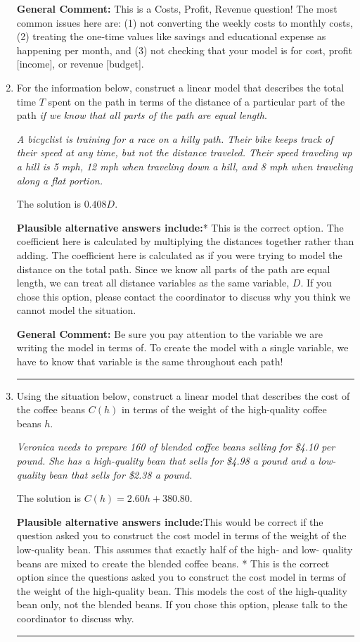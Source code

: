 \documentclass{extbook}[14pt]
\newcommand{\litem}[1]{\item #1

\rule{\textwidth}{0.4pt}}
\begin{document}
\begin{enumerate}
{\textbf{General Comment:} This is a Costs, Profit, Revenue question! The most common issues here are: (1) not converting the weekly costs to monthly costs, (2) treating the one-time values like savings and educational expense as happening per month, and (3) not checking that your model is for cost, profit [income], or revenue [budget].
}
\litem{
For the information below, construct a linear model that describes the total time $T$ spent on the path in terms of the distance of a particular part of the path \textit{if we know that all parts of the path are equal length}.

\begin{center}
    \textit{ A bicyclist is training for a race on a hilly path. Their bike keeps track of their speed at any time, but not the distance traveled. Their speed traveling up a hill is 5 mph, 12 mph when traveling down a hill, and 8 mph when traveling along a flat portion. }
\end{center}
The solution is \( 0.408 D \).\begin{enumerate}[label=\Alph*.]
\textbf{Plausible alternative answers include:}* This is the correct option.
The coefficient here is calculated by multiplying the distances together rather than adding.
The coefficient here is calculated as if you were trying to model the distance on the total path.
Since we know all parts of the path are equal length, we can treat all distance variables as the same variable, $D$.
If you chose this option, please contact the coordinator to discuss why you think we cannot model the situation.
\end{enumerate}

\textbf{General Comment:} Be sure you pay attention to the variable we are writing the model in terms of. To create the model with a single variable, we have to know that variable is the same throughout each path!
}
\litem{
Using the situation below, construct a linear model that describes the cost of the coffee beans $C(h)$ in terms of the weight of the high-quality coffee beans $h$.

\begin{center}
    \textit{ Veronica needs to prepare 160 of blended coffee beans selling for \$4.10 per pound. She has a high-quality bean that sells for \$4.98 a pound and a low-quality bean that sells for \$2.38 a pound. }
\end{center}
The solution is \( C(h) = 2.60 h + 380.80 \).\begin{enumerate}[label=\Alph*.]
\textbf{Plausible alternative answers include:}This would be correct if the question asked you to construct the cost model in terms of the weight of the low-quality bean.
This assumes that exactly half of the high- and low- quality beans are mixed to create the blended coffee beans.
* This is the correct option since the questions asked you to construct the cost model in terms of the weight of the high-quality bean.
This models the cost of the high-quality bean only, not the blended beans.
If you chose this option, please talk to the coordinator to discuss why.
\end{enumerate}

}
\end{enumerate}
\end{document}
